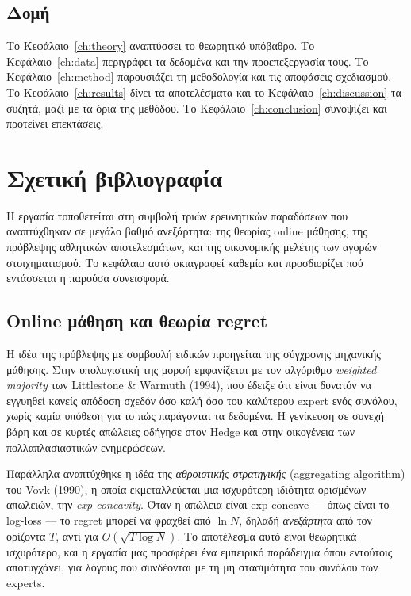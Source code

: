 \documentclass[12pt,a4paper,oneside]{report}
\newcommand{\en}[1]{\textenglish{#1}}
\renewcommand{\_}{\oldunderscore\allowbreak}
\theoremstyle{definition}
\theoremstyle{plain}
\theoremstyle{remark}
\begin{document}
\section{Δομή}

Το Κεφάλαιο~\ref{ch:theory} αναπτύσσει το θεωρητικό υπόβαθρο. Το Κεφάλαιο~\ref{ch:data}
περιγράφει τα δεδομένα και την προεπεξεργασία τους. Το Κεφάλαιο~\ref{ch:method} παρουσιάζει
τη μεθοδολογία και τις αποφάσεις σχεδιασμού. Το Κεφάλαιο~\ref{ch:results} δίνει τα
αποτελέσματα και το Κεφάλαιο~\ref{ch:discussion} τα συζητά, μαζί με τα όρια της μεθόδου. Το
Κεφάλαιο~\ref{ch:conclusion} συνοψίζει και προτείνει επεκτάσεις.

\chapter{Σχετική βιβλιογραφία}
\label{ch:related}

Η εργασία τοποθετείται στη συμβολή τριών ερευνητικών παραδόσεων που αναπτύχθηκαν σε μεγάλο
βαθμό ανεξάρτητα: της θεωρίας online μάθησης, της πρόβλεψης αθλητικών αποτελεσμάτων, και της
οικονομικής μελέτης των αγορών στοιχηματισμού. Το κεφάλαιο αυτό σκιαγραφεί καθεμία και
προσδιορίζει πού εντάσσεται η παρούσα συνεισφορά.

\section{Online μάθηση και θεωρία regret}

Η ιδέα της πρόβλεψης με συμβουλή ειδικών προηγείται της σύγχρονης μηχανικής μάθησης. Στην
υπολογιστική της μορφή εμφανίζεται με τον αλγόριθμο \emph{weighted majority} των Littlestone
\& Warmuth (1994), που έδειξε ότι είναι δυνατόν να εγγυηθεί κανείς απόδοση σχεδόν όσο καλή
όσο του καλύτερου expert ενός συνόλου, χωρίς καμία υπόθεση για το πώς παράγονται τα δεδομένα.
Η γενίκευση σε συνεχή βάρη και σε κυρτές απώλειες οδήγησε στον Hedge και στην οικογένεια των
πολλαπλασιαστικών ενημερώσεων.

Παράλληλα αναπτύχθηκε η ιδέα της \emph{αθροιστικής στρατηγικής} (\en{aggregating algorithm})
του Vovk (1990), η οποία εκμεταλλεύεται μια ισχυρότερη ιδιότητα ορισμένων απωλειών, την
\emph{exp-concavity}. Όταν η απώλεια είναι exp-concave --- όπως είναι το log-loss --- το
regret μπορεί να φραχθεί από $\ln N$, δηλαδή \emph{ανεξάρτητα} από τον ορίζοντα $T$, αντί
για $O(\sqrt{T \log N})$. Το αποτέλεσμα αυτό είναι θεωρητικά ισχυρότερο, και η εργασία μας
προσφέρει ένα εμπειρικό παράδειγμα όπου εντούτοις αποτυγχάνει, για λόγους που συνδέονται με
τη μη στασιμότητα του συνόλου των experts.
\end{document}
